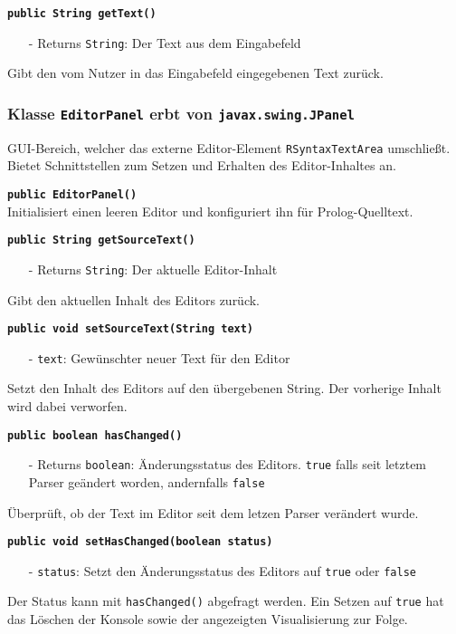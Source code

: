 \documentclass[parskip=full,11pt,twoside]{scrartcl}
\begin{document}
\textbf{\texttt{public String getText()}}\\
\begin{itemize}[noitemsep]
	\item[-] Returns \texttt{String}: Der Text aus dem Eingabefeld
\end{itemize}
Gibt den vom Nutzer in das Eingabefeld eingegebenen Text zurück.

\subsubsection{Klasse \texttt{EditorPanel} erbt von \texttt{javax.swing.JPanel}}

GUI-Bereich, welcher das externe Editor-Element \texttt{RSyntaxTextArea} umschließt. Bietet Schnittstellen zum Setzen und Erhalten des Editor-Inhaltes an.

\textbf{\texttt{public EditorPanel()}}\\
Initialisiert einen leeren Editor und konfiguriert ihn für Prolog-Quelltext.

\textbf{\texttt{public String getSourceText()}}\\
\begin{itemize}[noitemsep]
	\item[-] Returns \texttt{String}: Der aktuelle Editor-Inhalt
\end{itemize}
Gibt den aktuellen Inhalt des Editors zurück.

\textbf{\texttt{public void setSourceText(String text)}}
\begin{itemize}[noitemsep]
	\item[-] \texttt{text}: Gewünschter neuer Text für den Editor
\end{itemize}
Setzt den Inhalt des Editors auf den übergebenen String. Der vorherige Inhalt wird dabei verworfen.

\textbf{\texttt{public boolean hasChanged()}}\\
\begin{itemize}[noitemsep]
	\item[-] Returns \texttt{boolean}: Änderungsstatus des Editors. \texttt{true} falls seit letztem Parser geändert worden, andernfalls \texttt{false}
\end{itemize}
Überprüft, ob der Text im Editor seit dem letzen Parser verändert wurde.

\textbf{\texttt{public void setHasChanged(boolean status)}}\\
\begin{itemize}[noitemsep]
	\item[-] \texttt{status}: Setzt den Änderungsstatus des Editors auf \texttt{true} oder \texttt{false}
\end{itemize}
Der Status kann mit \texttt{hasChanged()} abgefragt werden. Ein Setzen auf \texttt{true} hat das Löschen der Konsole sowie der angezeigten Visualisierung zur Folge.
\end{document}
